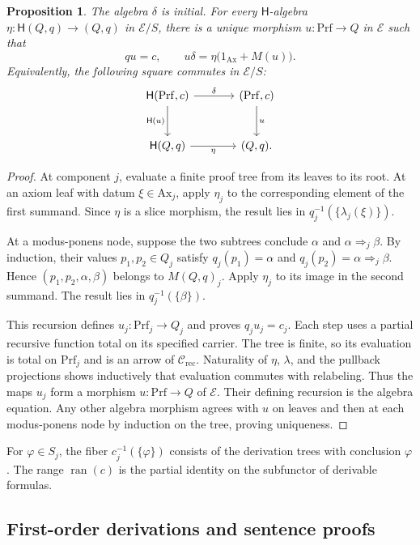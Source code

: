 \documentclass[11pt]{article}
\newtheorem{proposition}[theorem]{Proposition}
\newcommand{\ran}{\operatorname{ran}}
\begin{document}
\begin{proposition}\label{prop:fork-proof-initial}
The algebra $\delta$ is initial. For every
$\mathsf H$-algebra
$\eta:\mathsf H(Q,q)\to(Q,q)$ in $\mathcal E/S$, there is a unique
morphism $u:\mathrm{Prf}\to Q$ in $\mathcal E$ such that
\[
 qu=c,\qquad
 u\delta=\eta\bigl(1_{\mathrm{Ax}}+M(u)\bigr).
\]
Equivalently, the following square commutes in $\mathcal E/S$:
\[
\begin{tikzcd}[column sep=large,row sep=large]
 \mathsf H(\mathrm{Prf},c) \arrow[r,"\delta"]
       \arrow[d,"\mathsf H(u)"'] &
 (\mathrm{Prf},c) \arrow[d,"u"] \\
 \mathsf H(Q,q) \arrow[r,"\eta"'] & (Q,q).
\end{tikzcd}
\]
\end{proposition}
\begin{proof}
At component $j$, evaluate a finite proof tree from its leaves to
its root. At an axiom leaf with datum $\xi\in\mathrm{Ax}_j$, apply
$\eta_j$ to the corresponding element of the first summand.
Since $\eta$ is a slice morphism, the result lies in
$q_j^{-1}(\{\lambda_j(\xi)\})$.

At a modus-ponens node, suppose the two subtrees conclude
$\alpha$ and $\alpha\Rightarrow_j\beta$.
By induction, their values $p_1,p_2\in Q_j$ satisfy
$q_j(p_1)=\alpha$ and $q_j(p_2)=\alpha\Rightarrow_j\beta$. Hence
$(p_1,p_2,\alpha,\beta)$ belongs to $M(Q,q)_j$.
Apply $\eta_j$ to its image in the second summand. The result
lies in $q_j^{-1}(\{\beta\})$.

This recursion defines $u_j:\mathrm{Prf}_j\to Q_j$ and proves
$q_ju_j=c_j$. Each step uses a partial recursive function total
on its specified carrier. The tree is finite, so its evaluation
is total on $\mathrm{Prf}_j$ and is an arrow of
$\mathcal C_{\mathrm{rec}}$.
Naturality of $\eta$, $\lambda$, and the pullback projections
shows inductively that evaluation commutes with relabeling.
Thus the maps $u_j$ form a morphism $u:\mathrm{Prf}\to Q$ of
$\mathcal E$. Their defining recursion is the algebra equation.
Any other algebra morphism agrees with $u$ on leaves and then
at each modus-ponens node by induction on the tree, proving uniqueness.
\end{proof}

For $\varphi\in S_j$, the fiber $c_j^{-1}(\{\varphi\})$ consists
of the derivation trees with conclusion $\varphi$. The range
$\ran(c)$ is the partial identity on the subfunctor of derivable formulas.


\subsection{First-order derivations and sentence proofs}
\label{app:first-order-proofs}
\end{document}
